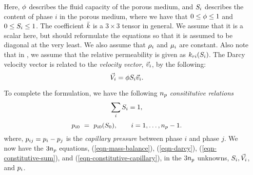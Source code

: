Here, $\phi$ describes the fluid capacity of the porous medium,
and $S_i$ describes the content of phase $i$ in the porous medium,
where we have that $0 \le \phi \le 1$ and $0 \le S_i \le 1$.
The coefficient ${\bar k}$ is a $3 \times 3$ tensor in general.
We assume that it is a scalar here, but should reformulate the
equations so that it is assumed to be diagonal at the very least.
We also assume that $\rho_i$ and $\mu_i$ are constant.
Also note that in \parflow{}, we assume that the relative permeability
is given as $k_{ri} (S_i)$.
The Darcy velocity vector is related to the {\em velocity vector}, ${\vec v}_i$,
by the following:
\begin{equation} \label{eqn-Dvec-vs-vvec}
{\vec V}_i = \phi S_i {\vec v}_i .
\end{equation}

To complete the formulation, we have the following
$n_p$ {\em consititutive relations}
\begin{equation} \label{eqn-constitutive-sum}
\sum_i S_i = 1 ,
\end{equation}
\begin{equation} \label{eqn-constitutive-capillary}
p_{i0} ~=~ p_{i0} ( S_0 ) ,
~~~~~~ i = 1 , \ldots , n_p - 1 .
\end{equation}
where, $p_{ij} = p_i - p_j$ is the {\em capillary pressure} between
phase $i$ and phase $j$.
We now have the $3 n_p$ equations,
(\ref{eqn-mass-balance}), (\ref{eqn-darcy}),
(\ref{eqn-constitutive-sum}), and (\ref{eqn-constitutive-capillary}),
in the $3 n_p$ unknowns,
$S_i, {\vec V}_i$, and $p_i$.

